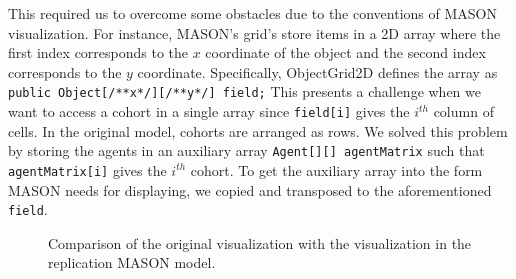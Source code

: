 \documentclass[runningheads,a4paper]{article}
\begin{document}
This required us to overcome some obstacles due to the conventions of MASON visualization. 
For instance, MASON's grid's store items in a 2D array where the first index corresponds to the $x$ coordinate of the object and the second index corresponds to the $y$ coordinate. 
Specifically, ObjectGrid2D defines the array as \lstinline!public Object[/**x*/][/**y*/] field;! 
This presents a challenge when we want to access a cohort in a single array since \lstinline!field[i]! gives the $i^{th}$ column of cells. In the original model, cohorts are arranged as rows. 
We solved this problem by storing the agents in an auxiliary array \lstinline!Agent[][] agentMatrix! such that \lstinline!agentMatrix[i]! gives the $i^{th}$ cohort.
To get the auxiliary array into the form MASON needs for displaying, we copied and transposed to the aforementioned \lstinline!field!.




\begin{figure}
\centering
\caption{Comparison of the original visualization with the visualization in the replication MASON model. }
\label{fig:gui-comparison}
\end{figure}
\end{document}

